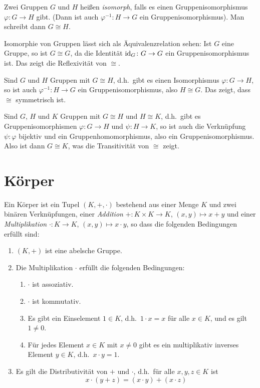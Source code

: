 \begin{defi}
 Zwei Gruppen $G$ und $H$ heißen \emph{isomorph}, falls es einen Gruppenisomorphismus $\varphi \colon G \to H$ gibt. (Dann ist auch $\varphi^{-1} \colon H \to G$ ein Gruppenisomorphismus). Man schreibt dann $G \cong H$.
\end{defi}


\begin{bem}\label{bem: groups being isomorphis is an equivalence relationship}
 Isomorphie von Gruppen lässt sich als Äquivalenzrelation sehen: Ist $G$ eine Gruppe, so ist $G \cong G$, da die Identität $\mathrm{id}_G \colon G \to G$ ein Gruppenisomorphismus ist. Das zeigt die Reflexivität von $\cong$.
 
 Sind $G$ und $H$ Gruppen mit $G \cong H$, d.h.\ gibt es einen Isomorphismus $\varphi \colon G \to H$, so ist auch $\varphi^{-1} \colon H \to G$ ein Gruppenisomorphismus, also $H \cong G$. Das zeigt, dass $\cong$ symmetrisch ist.
 
 Sind $G$, $H$ und $K$ Gruppen mit $G \cong H$ und $H \cong K$, d.h.\ gibt es Gruppenisomorphismen $\varphi \colon G \to H$ und $\psi \colon H \to K$, so ist auch die Verknüpfung $\psi \colon \varphi$ bijektiv und ein Gruppenhomomorphismus, also ein Gruppenisomorphismus. Also ist dann $G \cong K$, was die Transitivität von $\cong$ zeigt.
\end{bem}





\section{Körper}


\begin{defi}
 Ein Körper ist ein Tupel $(K, +, \cdot)$ bestehend aus einer Menge $K$ und zwei binären Verknüpfungen, einer \emph{Addition} $+ \colon K \times K \to K$, $(x,y) \mapsto x + y$ und einer \emph{Multiplikation} $\cdot \colon K \to K$, $(x,y) \mapsto x \cdot y$, so dass die folgenden Bedingungen erfüllt sind:
 \begin{enumerate}[label=\roman*)]
  \item
   $(K,+)$ ist eine abelsche Gruppe.
  \item
   Die Multiplikation $\cdot$ erfüllt die folgenden Bedingungen:
   \begin{enumerate}[label=\alph*)]
    \item
     $\cdot$ ist assoziativ.
    \item
     $\cdot$ ist kommutativ.
    \item
     Es gibt ein Einselement $1 \in K$, d.h.\ $1 \cdot x = x$ für alle $x \in K$, und es gilt $1 \neq 0$.
    \item
     Für jedes Element $x \in K$ mit $x \neq 0$ gibt es ein multiplikativ inverses Element $y \in K$, d.h.\ $x \cdot y = 1$.
   \end{enumerate}
  \item
   Es gilt die Distributivität von $+$ und $\cdot$, d.h.\ für alle $x,y,z \in K$ ist
   \[
    x \cdot (y + z)
    = (x \cdot y) + (x \cdot z)
   \]
 \end{enumerate}
\end{defi}


